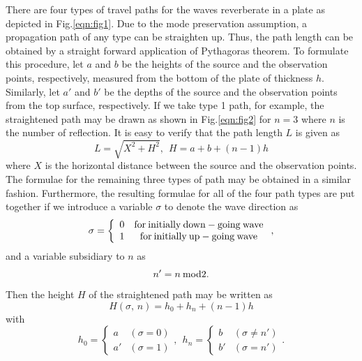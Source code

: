 ﻿\documentclass[11pt,a4j]{article}
\begin{document}
There are four types of travel paths for the waves reverberate in a plate 
as depicted in Fig.\ref{eqn:fig1}. Due to the mode preservation assumption, 
a propagation path of any type can be straighten up. Thus, the path length can 
be obtained by a straight forward application of Pythagoras theorem. 
To formulate this procedure, let $a$ and $b$ be the heights of the source 
and the observation points, respectively, measured from the bottom of 
the plate of thickness $h$. Similarly, let $a'$ and $b'$ be the depths 
of the source and the observation points from the top surface, respectively. 
If we take type 1 path, for example, the straightened path may be drawn 
as shown in Fig.\ref{eqn:fig2} for $n=3$ where $n$ is the number of reflection.
It is easy to verify that the path length $L$ is given as
\begin{equation}
	L=\sqrt{X^2+H^2}, \ \ H=a+b+(n-1)h
	\label{eqn:L3}
\end{equation}
where $X$ is the horizontal distance between the source and the observation points.
The formulae for the remaining three types of path may be obtained in a similar fashion.
Furthermore, the resulting formulae for all of the four path types are put together 
if we introduce a variable $\sigma$ to denote the wave direction as 
\begin{equation}
	\sigma=
	\left\{
	\begin{array}{cc}
		0 & {\rm for \: initially\: down-going\: wave} \\
		1 & {\rm for \: initially\: up-going\: wave} 
	\end{array}
	\right.
	,
	\label{eqn:def_sigma}
\end{equation}
and a variable subsidiary to $n$ as 
\begin{equation}
	n'=n \: {\rm mod} 2.
	\label{eqn:}
\end{equation}
Then the height $H$ of the straightened path may be written as 
\begin{equation}
	H(\sigma,\, n) = h_0+h_n+(n-1)h
	\label{eqn:}
\end{equation}
with 
\begin{equation}
	h_0=
	\left\{
	\begin{array}{cc}
		a &  (\sigma=0)\\
		a'&  (\sigma=1)
	\end{array}
	\right.
	, \ \ 
	h_n=
	\left\{
	\begin{array}{cc}
		b &  (\sigma \neq n')\\
		b'&  (\sigma = n')
	\end{array}
	\right.
	.
	\label{eqn:}
\end{equation}
\end{document}

